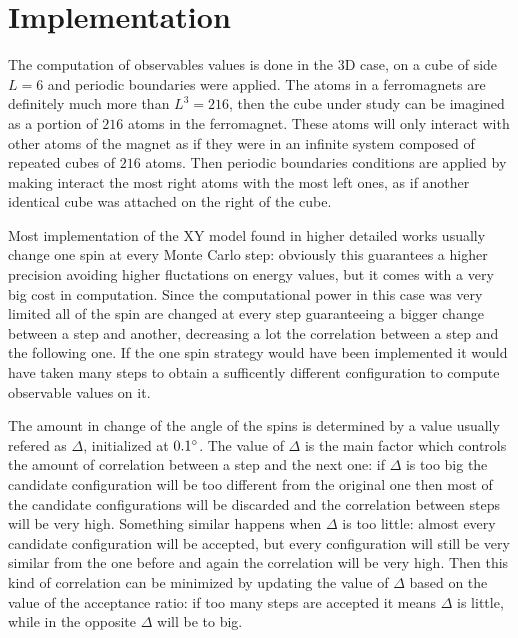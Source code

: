 \section{Implementation}

The computation of observables values is done in the 3D case, on a cube
of side $L=6$ and periodic boundaries were applied. The atoms in a ferromagnets are
definitely much more than $L^3 = 216$, then the cube under study can be imagined as 
a portion of $216$ atoms in the ferromagnet. These atoms will only interact with other
atoms of the magnet as if they were in an infinite system composed of repeated cubes 
of $216$ atoms. Then periodic boundaries conditions are applied by making interact
the most right atoms with the most left ones, as if another identical cube was
attached on the right of the cube.

Most implementation of the XY model found in higher detailed works usually change one spin
at every Monte Carlo step: obviously this guarantees a higher precision avoiding 
higher fluctations on energy values, but it comes with a very big cost in computation. 
Since the computational power in this case was very limited all of the spin are 
changed at every step guaranteeing a bigger change between a step and another, 
decreasing a lot the correlation between a step and the following one. If the one spin
strategy would have been implemented it would have taken many steps to obtain a 
sufficently different configuration to compute observable values on it.

The amount in change of the angle of the spins is determined by a value usually refered as 
$\Delta$, initialized at $0.1 \degree$. The value of $\Delta$ is the main factor which
controls the amount of correlation between a step and the next one: if $\Delta$ is too
big the candidate configuration will be too different from the original one then most
of the candidate configurations will be discarded and the correlation between steps will
be very high. Something similar happens when $\Delta$ is too little: almost every
candidate configuration will be accepted, but every configuration will still be very
similar from the one before and again the correlation will be very high. Then this
kind of correlation can be minimized by updating the value of $\Delta$ based on the value
of the acceptance ratio: if too many steps are accepted it means $\Delta$ is little,
while in the opposite $\Delta$ will be to big.

